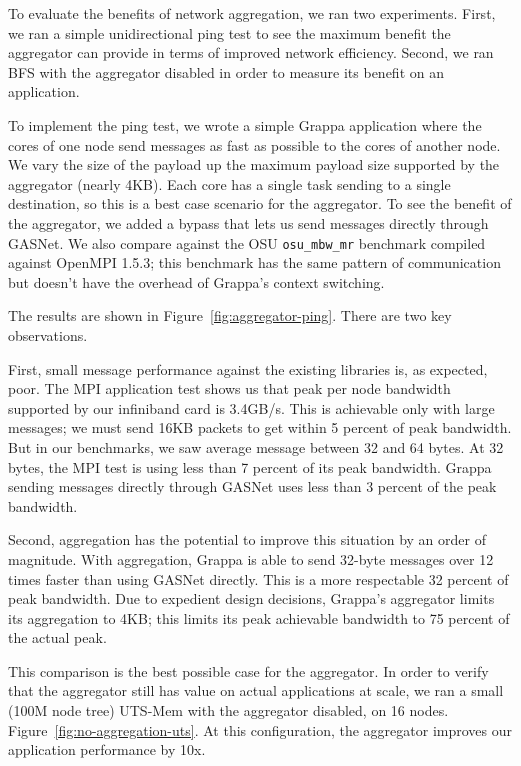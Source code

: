 To evaluate the benefits of network aggregation, we ran two experiments.
First, we ran a simple unidirectional ping test to see the maximum
benefit the aggregator can provide in terms of improved network
efficiency. Second, we ran BFS with the aggregator disabled in order to
measure its benefit on an application.

To implement the ping test, we wrote a simple Grappa application where
the cores of one node send messages as fast as possible to the cores
of another node. We vary the size of the payload up the maximum
payload size supported by the aggregator (nearly 4KB). Each core has a
single task sending to a single destination, so this is a best case
scenario for the aggregator. To see the benefit of the aggregator, we
added a bypass that lets us send messages directly through GASNet. We
also compare against the OSU \texttt{osu\_mbw\_mr} benchmark
\cite{osu:mpi}  compiled against OpenMPI 1.5.3; this
benchmark has the same pattern of communication but doesn't have the
overhead of Grappa's context switching.

The results are shown in Figure~\ref{fig:aggregator-ping}. There are
two key observations.

First, small message performance against the existing libraries is, as expected, poor. The MPI application test shows us that peak per node
bandwidth supported by our infiniband card is 3.4GB/s. This is
achievable only with large messages; we must send 16KB packets to get
within 5 percent of peak bandwidth. But in our benchmarks, we saw
average message between 32 and 64 bytes. At 32 bytes, the MPI test is
using less than 7 percent of its peak bandwidth. Grappa sending
messages directly through GASNet uses less than 3 percent of the peak
bandwidth.

Second, aggregation has the potential to improve this situation by an
order of magnitude. With aggregation, Grappa is able to send 32-byte
messages over 12 times faster than using GASNet directly. This is a
more respectable 32 percent of peak bandwidth. Due to expedient design
decisions, Grappa's aggregator limits its aggregation to 4KB; this
limits its peak achievable bandwidth to 75 percent of the actual
peak.

This comparison is the best possible case for the aggregator. In
order to verify that the aggregator still has value on actual
applications at scale, we ran a small (100M node tree) UTS-Mem
with the aggregator disabled, on 16 nodes.
Figure~\ref{fig:no-aggregation-uts}. At this configuration, the aggregator
improves our application performance by 10x. 

